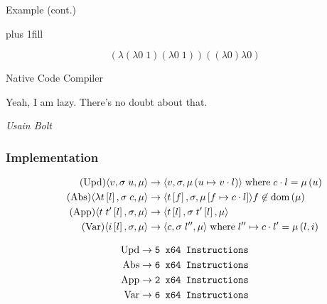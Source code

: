 \documentclass[14pt,mathserif]{beamer}
\newcommand{\sectionslide}[3]{
  \begin{frame}
  \vspace{1cm}
  \vfill
  {\usebeamerfont{title} \color{red} #1}
  \vfill
  \epigraph{\footnotesize{#2}}{\footnotesize{\emph{#3}}}
  \end{frame}}
\begin{document}
\begin{frame}{Example (cont.)}
\begin{center}
\vskip0pt plus 1fill
\end{center}
$$(\lambda (\lambda 0 \; 1) (\lambda 0 \; 1))((\lambda 0) \lambda 0)$$
\end{frame}

\sectionslide{Native Code Compiler}
{Yeah, I am lazy. There's no doubt about that.}
{Usain Bolt}

\begin{frame}
\frametitle{Implementation}
\footnotesize
\begin{align*}
\tag{Upd}
\langle v,  \sigma \; u , \mu \rangle 
  &\rightarrow
\langle v, \sigma, \mu\left(u \mapsto v \cdot l\right) \rangle  
\; \textnormal{where} \; c \cdot l = \mu\left(u\right) \\
\tag{Abs}
\langle \lambda t\left[l\right], \sigma \; c, \mu \rangle 
  &\rightarrow
\langle t\left[f\right], \sigma, \mu\left[f \mapsto c \cdot l\right]\rangle f
\not \in \textnormal{dom}\left(\mu\right)  \\
\tag{App}
\langle t \; t'\left[l\right], \sigma, \mu \rangle
  &\rightarrow
\langle t\left[l\right], \sigma \; t'\left[l\right], \mu \rangle \\
\tag{Var}
\langle i\left[l\right], \sigma, \mu \rangle
  &\rightarrow
\langle c, \sigma \; l'', \mu \rangle
\; \textnormal{where} \; l'' \mapsto c \cdot l' = \mu\left(l, i\right)
\end{align*}

\begin{align*}
\textmd{Upd} &\rightarrow \texttt{5 x64 Instructions} \\
\textmd{Abs} &\rightarrow \texttt{6 x64 Instructions} \\
\textmd{App} &\rightarrow \texttt{2 x64 Instructions} \\
\textmd{Var} &\rightarrow \texttt{6 x64 Instructions} \\
\end{align*}
\end{frame}
\end{document}
